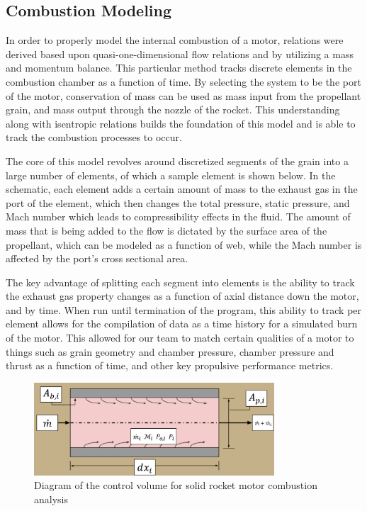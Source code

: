 \subsection{Combustion Modeling}
In order to properly model the internal combustion of a motor, relations were derived based upon quasi-one-dimensional flow relations and by utilizing a mass and momentum balance. This particular method tracks discrete elements in the combustion chamber as a function of time. By selecting the system to be the port of the motor, conservation of mass can be used as mass input from the propellant grain, and mass output through the nozzle of the rocket. This understanding along with isentropic relations builds the foundation of this model and is able to track the combustion processes to occur.

The core of this model revolves around discretized segments of the grain into a large number of elements, of which a sample element is shown below. In the schematic, each element adds a certain amount of mass to the exhaust gas in the port of the element, which then changes the total pressure, static pressure, and Mach number which leads to compressibility effects in the fluid. The amount of mass that is being added to the flow is dictated by the surface area of the propellant, which can be modeled as a function of web, while the Mach number is affected by the port's cross sectional area.

The key advantage of splitting each segment into elements is the ability to track the exhaust gas property changes as a function of axial distance down the motor, and by time. When run until termination of the program, this ability to track per element allows for the compilation of data as a time history for a simulated burn of the motor. This allowed for our team to match certain qualities of a motor to things such as grain geometry and chamber pressure, chamber pressure and thrust as a function of time, and other key propulsive performance metrics.

\begin{figure}
    \centering
    \includegraphics[width=0.8\textwidth]{images/combustion-diagram}
    \caption{Diagram of the control volume for solid rocket motor combustion analysis}
    \label{figure:combustion-diagram}
\end{figure}

